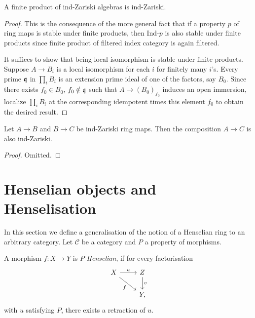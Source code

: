 \begin{lemma}
  A finite product of ind-Zariski algebras is ind-Zariski.
  \label{lemma:ind-Zariski-products}
\end{lemma}

\begin{proof}
  This is the consequence of the more general fact that if a property $p$ of ring maps is stable under finite products, then Ind-$p$ is also stable under finite products since finite product of filtered index category is again filtered. 
  
  It suffices to show that being local isomorphism is stable under finite products. Suppose $A \to B_i$ is a local isomorphism for each $i$ for finitely many $i$'s. Every prime ${\mathfrak{q}}$ in $\prod_i B_i$ is an extension prime ideal of one of the factors, say $B_0$. Since there exists $f_0 \in B_0$, $f_0 \notin {\mathfrak{q}}$ such that $A \to (B_0)_{f_0}$ induces an open immersion, localize $\prod_i B_i$ at the corresponding idempotent times this element \(f_0\) to obtain the desired result.
\end{proof}

\begin{lemma}
  \label{thm:ind-Zariski-composition}
  Let \(A \to B\) and \(B \to C\) be ind-Zariski ring maps. Then the composition \(A \to C\) is also ind-Zariski.
\end{lemma}

\begin{proof}
  Omitted.
\end{proof}

\section{Henselian objects and Henselisation}

In this section we define a generalisation of the notion of a Henselian ring to an arbitrary category. Let $\mathcal{C}$ be a category
and $P$ a property of morphisms.

\begin{definition}[Henselian]
    A morphism $f\colon X \to Y$ is $P$-\emph{Henselian}, if for every factorisation
    \[
    \begin{tikzcd}
        X \arrow{r}{u} \arrow[swap]{dr}{f} & Z \arrow{d}{v} \\
                    & Y,
    \end{tikzcd}
    \] with $u$ satisfying $P$, there exists a retraction of $u$.
    \label{def:p-henselian}
\end{definition}

